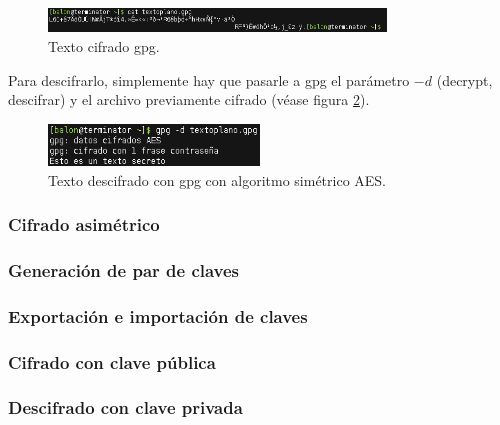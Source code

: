 \documentclass[a4paper, 11pt, titlepage]{book}
\begin{document}
                \begin{figure}[htp]
                    \centering
                    \includegraphics[width=0.8\textwidth]{resources/crypt02.png}
                    \caption{Texto cifrado gpg.}
                    \label{crypt02}
                \end{figure}
    
                Para descifrarlo, simplemente hay que pasarle a gpg el parámetro $-d$ (decrypt, descifrar) y el archivo 
                previamente cifrado (véase figura \ref{decrypt01}).
    
                \begin{figure}[htp]
                    \centering
                    \includegraphics[width=0.5\textwidth]{resources/decrypt01.png}
                    \caption{Texto descifrado con gpg con algoritmo simétrico AES.}
                    \label{decrypt01}
                \end{figure}
    
            \subsubsection{Cifrado asimétrico}
                
    
                \subsubsection{Generación de par de claves}
    
                \subsubsection{Exportación e importación de claves}
    
                \subsubsection{Cifrado con clave pública}
    
                \subsubsection{Descifrado con clave privada}
    
\end{document}
